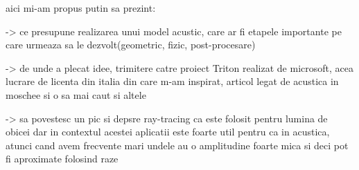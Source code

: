 aici mi-am propus putin sa prezint:

-> ce presupune realizarea unui model acustic, care ar fi etapele importante pe care urmeaza sa le dezvolt(geometric, fizic, post-procesare)

-> de unde a plecat idee, trimitere catre proiect Triton realizat de microsoft, acea lucrare de licenta din italia din care m-am inspirat, articol legat de acustica in moschee si o sa mai caut si altele  

-> sa povestesc un pic si depsre ray-tracing ca este folosit pentru lumina de obicei dar in contextul acestei aplicatii este foarte util pentru ca in acustica, atunci cand avem frecvente mari undele au o amplitudine foarte mica si deci pot fi aproximate folosind raze


